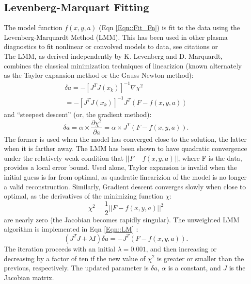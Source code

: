 \subsection{Levenberg-Marquart Fitting}\label{sec::LM}
\hspace*{4ex}The model function $f(x,y,a)$ (Eqn \ref{Eqn::Fit_Fn}) is fit to the data using the Levenberg-Marquardt Method (LMM). This has been used in other plasma diagnostics to fit nonlinear or convolved models to data, see citations \cite{Nikolić200167}\cite{Heesterman}\cite{Avdeeva}\cite{Pablant}\cite{Reinke}\cite{Luxon} or \cite{Lazerson}\\
\hspace*{4ex}The LMM, as derived independently by K. Levenberg\cite{LEVENBERG} and D. Marquardt\cite{marquardt1963algorithm}, combines the classical minimization techniques of linearizion (known alternately as the Taylor expansion method or the Gauss-Newton method):
\begin{eqnarray}\label{Eqn::G-N}
\delta{a} = -[J^TJ(x_k)]^{-1}\nabla{\chi^2} \nonumber\\ = -[J^TJ(x_k)]^{-1}{J^T}(F-f(x,y,a))
\end{eqnarray} 
and ``steepest descent'' (or, the gradient method):
\begin{equation}\label{Eqn::Grad}
\delta{a} = \alpha\times\frac{\partial\chi^2}{\partial{a}} = \alpha\times{J^T}(F-f(x,y,a)).
\end{equation}
The former is used when the model has converged close to the solution, the latter when it is farther away. The LMM has been shown to have quadratic convergence\cite{Fan2005} under the relatively weak condition that $||F-f(x,y,a)||$, where F is the data, provides a local error bound. Used alone, Taylor expansion is invalid when the initial guess is far from optimal, as quadratic linearizion of the model is no longer a valid reconstruction. Similarly, Gradient descent converges slowly when close to optimal, as the derivatives of the minimizing function $\chi$:
\begin{equation}\label{Eqn::Chi}
\chi^2 = \frac{1}{2}||F-f(x,y,a)||^2
\end{equation}
 are nearly zero (the Jacobian becomes rapidly singular). The unweighted LMM algorithm is implemented in Eqn \ref{Eqn::LM} \cite{press1996numerical}\cite{nocedal2006numerical}:\\
\begin{equation}\label{Eqn::LM}
(J^TJ+\lambda{I})\delta{a}=-J^T(F-f(x,y,a)).
\end{equation}
The iteration proceeds with an initial $\lambda=0.001$, and then increasing or decreasing by a factor of ten if the new value of $\chi^2$ is greater or smaller than the previous, respectively. The updated parameter is $\delta{a}$, $\alpha$ is a constant, and $J$ is the Jacobian matrix. 

